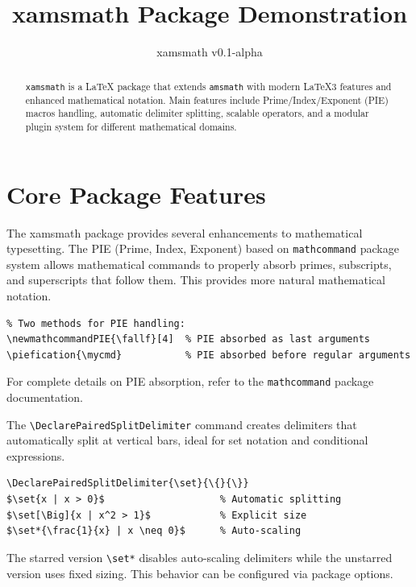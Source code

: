 \documentclass{article}
\title{xamsmath Package Demonstration}
\author{xamsmath v0.1-alpha}
\date{}
\begin{document}
\newpage

\maketitle

\begin{abstract}
  \texttt{xamsmath} is a LaTeX package that extends \texttt{amsmath} with modern LaTeX3 features and enhanced mathematical notation. Main features include Prime/Index/Exponent (PIE) macros handling, automatic delimiter splitting, scalable operators, and a modular plugin system for different mathematical domains. 
\end{abstract}

\tableofcontents

\section{Core Package Features}

The xamsmath package provides several enhancements to mathematical typesetting. The PIE (Prime, Index, Exponent) based on \texttt{mathcommand} package system allows mathematical commands to properly absorb primes, subscripts, and superscripts that follow them. This provides more natural mathematical notation.

\begin{verbatim}
% Two methods for PIE handling:
\newmathcommandPIE{\fallf}[4]  % PIE absorbed as last arguments
\piefication{\mycmd}           % PIE absorbed before regular arguments
\end{verbatim}

For complete details on PIE absorption, refer to the \texttt{mathcommand} package documentation.

The \verb|\DeclarePairedSplitDelimiter| command creates delimiters that automatically split at vertical bars, ideal for set notation and conditional expressions.

\begin{verbatim}
\DeclarePairedSplitDelimiter{\set}{\{}{\}}
$\set{x | x > 0}$                    % Automatic splitting
$\set[\Big]{x | x^2 > 1}$            % Explicit size  
$\set*{\frac{1}{x} | x \neq 0}$      % Auto-scaling
\end{verbatim}

The starred version \verb|\set*| disables auto-scaling delimiters while the unstarred version uses fixed sizing. This behavior can be configured via package options.
\end{document}
